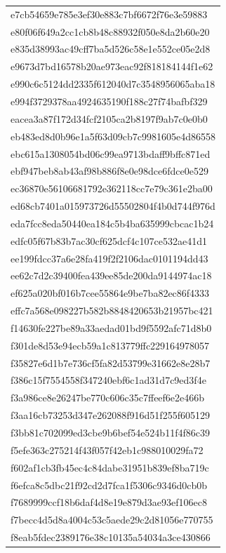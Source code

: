 \begin{tabular}{l}
e7cb54659e785e3ef30e883c7bf6672f76e3e59883 \\
e80f06f649a2cc1cb8b48c88932f050e8da2b60e20 \\
e835d38993ac49cff7ba5d526c58e1e552ce05e2d8 \\
e9673d7bd16578b20ae973eac92f818184144f1e62 \\
e990c6c5124dd2335f612040d7c3548956065aba18 \\
e994f3729378aa4924635190f188c27f74bafbf329 \\
eacea3a87f172d34fcf2105ca2b8197f9ab7c0e0b0 \\
eb483ed8d0b96e1a5f63d09cb7c9981605e4d86558 \\
ebc615a1308054bd06c99ea9713bdaff9bffc871ed \\
ebf947beb8ab43af98b886f8e0e98dce6fdce0e529 \\
ec36870e56106681792e362118cc7e79c361e2ba00 \\
ed68cb7401a015973726d55502804f4b0d744f976d \\
eda7fcc8eda50440ea184c5b4ba635999cbcac1b24 \\
edfc05f67b83b7ac30cf625dcf4c107ce532ae41d1 \\
ee199fdcc37a6e28fa419f2f2106dac0101194dd43 \\
ee62c7d2c39400fea439ee85de200da9144974ac18 \\
ef625a020bf016b7cee55864e9be7ba82ec86f4333 \\
effc7a568e098227b582b8848420653b21957bc421 \\
f14630fe227be89a33aedad01bd9f5592afc71d8b0 \\
f301de8d53e94ecb59a1c813779ffc229164978057 \\
f35827e6d1b7e736cf5fa82d53799e31662e8e28b7 \\
f386c15f7554558f347240ebf6c1ad31d7c9ed3f4e \\
f3a986ce8e26247be770c606c35c7ffeef6e2e466b \\
f3aa16cb73253d347e262088f916d51f255f605129 \\
f3bb81c702099ed3cbe9b6bef54e524b11f4f86c39 \\
f5efe363c275214f43f057f42eb1c988010029fa72 \\
f602af1cb3fb45ec4c84dabe31951b839ef8ba719c \\
f6efca8c5dbc21f92cd2d7fca1f5306c9346d0cb0b \\
f7689999ccf18b6daf4d8e19e879d3ae93ef106ec8 \\
f7becc4d5d8a4004c53c5aede29c2d81056e770755 \\
f8eab5fdec2389176e38c10135a54034a3ce430866 \\

\end{tabular}
